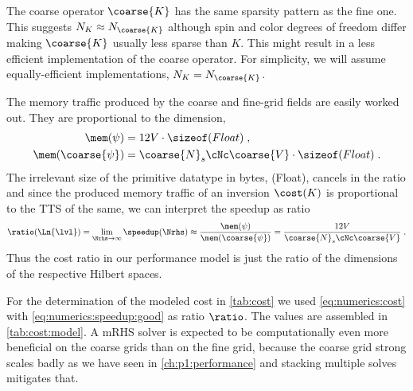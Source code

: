 The coarse operator $\coarse{K}$ has the same sparsity pattern as the fine one.
This suggests $N_{K} \approx N_{\coarse{K}}$ although spin and color degrees of freedom differ making $\coarse{K}$ usually less sparse than $K$.
This might result in a less efficient implementation of the coarse operator.
For simplicity, we will assume equally-efficient implementations, $N_{K} = N_{\coarse{K}}$.

The memory traffic produced by the coarse and fine-grid fields are easily worked out.
They are proportional to the dimension,
\begin{align}
\mem(\psi) &= 12 V \cdot \sizeof(Float) \;, \\
\mem(\coarse{\psi}) &= \coarse{N}_s \cNc \coarse{V} \cdot \sizeof(Float) \;.
\end{align}
The irrelevant size of the primitive datatype in bytes, \sizeof(Float), cancels in the ratio and since the produced memory traffic of an inversion $\cost(K)$ is proportional to the TTS of the same, we can interpret the speedup as ratio
\begin{equation} \label{eq:numerics:speedup:good}
\ratio(\Ln{\lvl})
= \lim_{\Nrhs \to \infty} \speedup(\Nrhs)
\approx \frac{ \mem(\psi) }{ \mem(\coarse{\psi}) }
= \frac{12 V}{ \coarse{N}_s \cNc \coarse{V} } \;.
\end{equation}
Thus the cost ratio in our performance model is just the ratio of the dimensions of the respective Hilbert spaces.

For the determination of the modeled cost in \cref{tab:cost} we used \cref{eq:numerics:cost} with \cref{eq:numerics:speedup:good} as ratio $\ratio$.
The values are assembled in \cref{tab:cost:model}.
A mRHS solver is expected to be computationally even more beneficial on the coarse grids than on the fine grid, because the coarse grid strong scales badly as we have seen in \cref{ch:p1:performance} and stacking multiple solves mitigates that.

